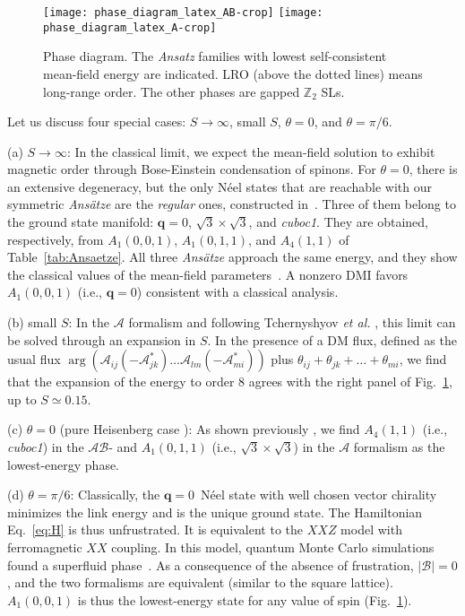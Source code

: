 \documentclass[aps,prl,twocolumn,superscriptaddress,showpacs,a4paper, longbibliography]{revtex4-1}
\newcommand{\qzero}{$\mathbf q=0$}
\newcommand{\cuboc}{\textit{cuboc1}}
\newcommand{\sqrtsqrt}{$\sqrt3\times\sqrt3$}
\begin{document}
\begin{figure}
 \texttt{[image: phase\_diagram\_latex\_AB-crop]}
 \texttt{[image: phase\_diagram\_latex\_A-crop]}
 \caption{Phase diagram.
 The \textit{Ansatz} families with lowest self-consistent mean-field energy are indicated.
 LRO (above the dotted lines) means long-range order.
 The other phases are gapped $\mathbb Z_2$ SLs.
 }
\label{fig:phase_diagram}
\end{figure}

Let us discuss four special cases: $S\to\infty$, small $S$, $\theta=0$, and $\theta=\pi/6$.

(a) $S\to\infty$:
In the classical limit, we expect the mean-field solution to exhibit magnetic order through Bose-Einstein condensation of spinons.
For $\theta=0$, there is an extensive degeneracy, but the only N\'eel states that are reachable with our symmetric \textit{Ans\"atze} are the \textit{regular} ones, constructed in~\cite{Regular_order}.
Three of them belong to the ground state manifold: \qzero, \sqrtsqrt, and \cuboc.
They are obtained, respectively, from $A_1(0,0,1)$, $A_1(0,1,1)$, and $A_4(1,1)$ of Table~\ref{tab:Ansaetze}. All three \textit{Ans\"atze} approach the same energy, and they show the classical values of the mean-field parameters~\cite{PSG_chiral}. A nonzero DMI favors $A_1(0,0,1)$ (i.e., \qzero) consistent with a classical analysis.

(b) small $S$:
In the $\mathcal A$ formalism and following \mbox{Tchernyshyov} {\it et al.} \cite{flux}, this limit can be solved through an expansion in $S$. In the presence of a DM flux, defined as the usual flux $\arg(\mathcal A_{ij}(-\mathcal A^*_{jk})\dots \mathcal A_{lm}(-\mathcal A_{mi}^*))$ plus $\theta_{ij}+\theta_{jk}+\dots+\theta_{mi}$, we find that the expansion of the energy to order 8 agrees with the right panel of Fig.~\ref{fig:phase_diagram}, up to $S\simeq0.15$.

(c) $\theta=0$ (pure Heisenberg case \cite{pureHeisenberg}):
As shown previously \cite{cuboc1}, we find $A_4(1,1)$ (i.e., \cuboc) in the $\mathcal A\mathcal B$- and $A_1(0,1,1)$ (i.e., $\sqrt3\times\sqrt3$) in the $\mathcal A$ formalism as the lowest-energy phase.

(d) $\theta=\pi/6$:
Classically, the \qzero\ N\'eel state with well chosen vector chirality minimizes the link energy and is the unique ground state.
The Hamiltonian Eq.~\eqref{eq:H} is thus unfrustrated.
It is equivalent to the $XXZ$ model with ferromagnetic $XX$ coupling.
In this model, quantum Monte Carlo simulations found a superfluid phase~\cite{Kag_XXZ_ferro}.
As a consequence of the absence of frustration, $|\mathcal B|=0$, and the two formalisms are equivalent (similar to the square lattice).
$A_1(0,0,1)$ is thus the lowest-energy state for any value of spin (Fig.~\ref{fig:phase_diagram}).
\end{document}
